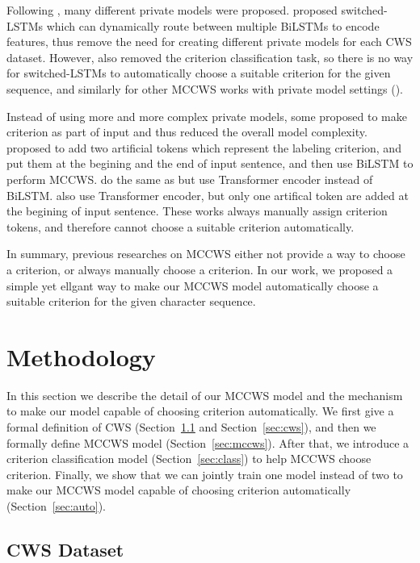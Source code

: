 \documentclass[11pt]{article}
\begin{document}
Following \cite{chen-etal-2017-adversarial}, many different private models were proposed.
\cite{Gong-2019-switch} proposed switched-LSTMs which can dynamically route between multiple BiLSTMs to encode features, thus remove the need for creating different private models for each CWS dataset.
However, \cite{Gong-2019-switch} also removed the criterion classification task, so there is no way for switched-LSTMs to automatically choose a suitable criterion for the given sequence, and similarly for other MCCWS works with private model settings (\cite{huang-etal-2020-towards,qiu-etal-2020-concise}).

Instead of using more and more complex private models, some proposed to make criterion as part of input and thus reduced the overall model complexity.
\cite{He-2019-effective} proposed to add two artificial tokens which represent the labeling criterion, and put them at the begining and the end of input sentence, and then use BiLSTM to perform MCCWS.
\cite{huang-etal-2020-joint-multiple} do the same as \cite{He-2019-effective} but use Transformer encoder \cite{vaswani-2017-attention} instead of BiLSTM.
\cite{ke-etal-2021-pre} also use Transformer encoder, but only one artifical token are added at the begining of input sentence.
These works always manually assign criterion tokens, and therefore cannot choose a suitable criterion automatically.

In summary, previous researches on MCCWS either not provide a way to choose a criterion, or always manually choose a criterion.
In our work, we proposed a simple yet ellgant way to make our MCCWS model automatically choose a suitable criterion for the given character sequence.

\section{Methodology}

In this section we describe the detail of our MCCWS model and the mechanism to make our model capable of choosing criterion automatically.
We first give a formal definition of CWS (Section~\ref{sec:data} and Section~\ref{sec:cws}), and then we formally define MCCWS model (Section~\ref{sec:mccws}).
After that, we introduce a criterion classification model (Section~\ref{sec:class}) to help MCCWS choose criterion.
Finally, we show that we can jointly train one model instead of two to make our MCCWS model capable of choosing criterion automatically (Section~\ref{sec:auto}).

\subsection{CWS Dataset}\label{sec:data}
\end{document}
